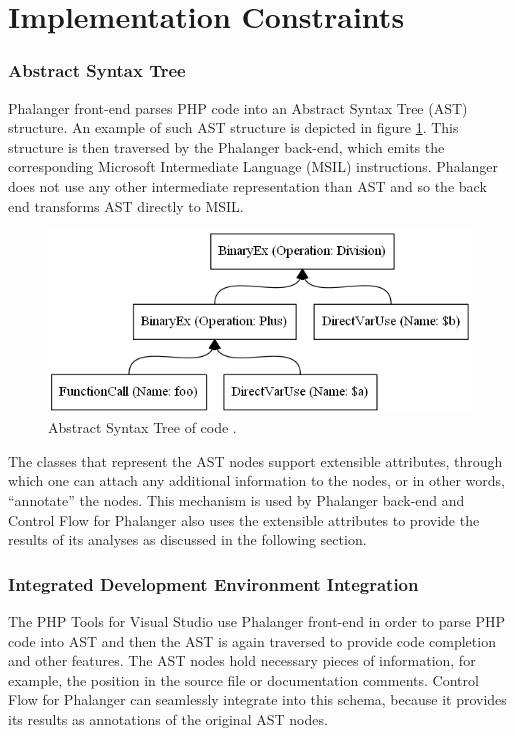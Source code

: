     \section{Implementation Constraints}
    
    \subsubsection*{Abstract Syntax Tree}     
    Phalanger front-end parses PHP code into an Abstract 
    Syntax Tree (AST) \cite{aho1985compilers} structure. 
    An example of such AST structure is depicted in 
    figure \ref{estexample}. This structure is then traversed 
    by the Phalanger back-end, which emits the 
    corresponding Microsoft Intermediate Language 
    (MSIL) instructions. Phalanger does not use any other 
    intermediate representation than AST and so the back end 
    transforms AST directly to MSIL.
    
\begin{figure}[h]  
  \centering
    \includegraphics*[scale=0.5]{graphs/evaltree-ast.png}  
    \caption{Abstract Syntax Tree of code .\label{estexample}}
\end{figure}      
    
    The classes that represent the AST nodes support extensible 
    attributes, through which one can attach any additional 
    information to the nodes, or in other words, ``annotate'' the nodes. 
    This mechanism is used by Phalanger back-end and 
    Control Flow for Phalanger also uses the extensible 
    attributes to provide the results 
    of its analyses as discussed in the following section.
    
    \subsubsection*{Integrated Development Environment Integration}
    The PHP Tools for Visual Studio use Phalanger 
    front-end in order to parse PHP code into AST 
    and then the AST is again traversed to provide 
    code completion and other features. The AST nodes 
    hold necessary pieces of information, for example, 
    the position in the source file or documentation comments.
    Control Flow for Phalanger can seamlessly integrate 
    into this schema, because it provides its results 
    as annotations of the original AST nodes.
    
